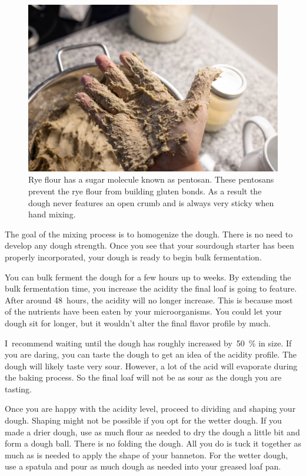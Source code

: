 \begin{figure}[!htb]
  \includegraphics[width=\textwidth]{sticky-hands}
  \caption{Rye flour has a sugar molecule known as pentosan. These pentosans prevent
  the rye flour from building gluten bonds. As a result the dough never features an
  open crumb and is always very sticky when hand mixing.}%
  \label{fig:non-wheat-sticky-hands}
\end{figure}

The goal of the mixing process is to homogenize the dough. There
is no need to develop any dough strength. Once you see that
your sourdough starter has been properly incorporated, your
dough is ready to begin bulk fermentation.

You can bulk ferment the dough for a few hours up to
weeks. By extending the bulk fermentation time, you increase
the acidity the final loaf is going to feature. After around
48~hours, the acidity will no longer increase. This is because
most of the nutrients have been eaten by your microorganisms.
You could let your dough sit for longer, but it wouldn't alter the
final flavor profile by much.

I~recommend waiting until the dough has roughly increased by~\qty{50}{\percent}
in size. If you are daring, you can taste the dough
to get an idea of the acidity profile. The dough will likely
taste very sour. However, a lot of the acid will evaporate
during the baking process. So the final loaf will not be
as sour as the dough you are tasting.

Once you are happy with the acidity level, proceed to dividing
and shaping your dough. Shaping might not be possible if you opt
for the wetter dough. If you made a drier dough, use as much
flour as needed to dry the dough a little bit and form a dough ball.
There is no folding the dough. All you do is tuck it together
as much as is needed to apply the shape of your banneton.
For the wetter dough, use a spatula and pour as much dough as
needed into your greased loaf pan.

